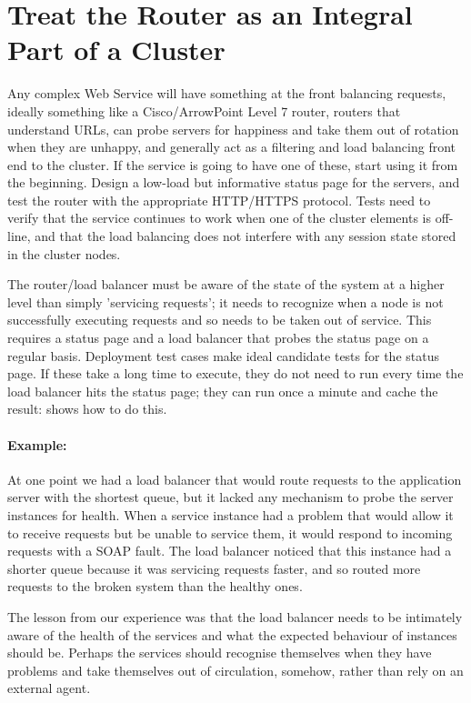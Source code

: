 \documentclass[draft]{report}
\begin{document}
\section{Treat the Router as an Integral Part of a Cluster}

Any complex Web Service will have something at the front balancing
requests, ideally something like a Cisco/ArrowPoint Level 7 router,
routers that understand URLs, can probe servers for happiness and take
them out of rotation when they are unhappy, and generally act as a
filtering and load balancing front end to the cluster. If the service is
going to have one of these, start using it from the beginning. Design a
low-load but informative status page for the servers, and test the
router with the appropriate HTTP/HTTPS protocol. Tests need to verify
that the service continues to work when one of the cluster elements is
off-line, and that the load balancing does not interfere with any
session state stored in the cluster nodes.

The router/load balancer must be aware of the state of the system at a
higher level than simply 'servicing requests'; it needs to recognize
when a node is not successfully executing requests and so needs to be
taken out of service. This requires a status page and a load balancer
that probes the status page on a regular basis. Deployment test cases
make ideal candidate tests for the status page. If these take a long
time to execute, they do not need to run every time the load balancer
hits the status page; they can run once a minute and cache the result:
\cite{bulka:performance} shows how to do this.

\paragraph{Example:} At one point we had a load balancer that would
route requests to the application server with the shortest queue, but it
lacked any mechanism to probe the server instances for health. When a
service instance had a problem that would allow it to receive requests
but be unable to service them, it would respond to incoming requests
with a SOAP fault. The load balancer noticed that this instance had a
shorter queue because it was servicing requests faster, and so routed
more requests to the broken system than the healthy ones.

The lesson from our experience was that the load balancer needs to be
intimately aware of the health of the services and what the expected
behaviour of instances should be. Perhaps the services should recognise
themselves when they have problems and take themselves out of
circulation, somehow, rather than rely on an external agent.
\end{document}

